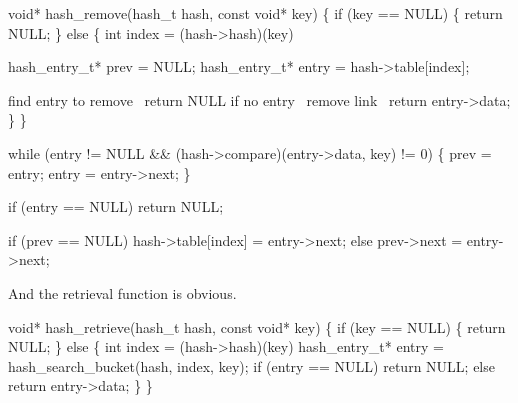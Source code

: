 \nwenddocs{}\plusendmoddef
void* hash_remove(hash_t hash, const void* key)
\{
    if (key == NULL) \{
        return NULL;
    \} else \{
        int index = (hash->hash)(key) %

        hash_entry_t* prev  = NULL;
        hash_entry_t* entry = hash->table[index];

        \LA{}find entry to remove~{\nwtagstyle{}}\RA{}
        \LA{}return NULL if no entry~{\nwtagstyle{}}\RA{}
        \LA{}remove link~{\nwtagstyle{}}\RA{}
        return entry->data;
    \}
\}

\nwendcode{}\nwdocspar

\nwenddocs{}\endmoddef
while (entry != NULL && (hash->compare)(entry->data, key) != 0) \{
    prev  = entry;
    entry = entry->next;
\}

\nwendcode{}\nwdocspar

\nwenddocs{}\endmoddef
if (entry == NULL)
    return NULL;

\nwendcode{}\nwdocspar

\nwenddocs{}\endmoddef
if (prev == NULL)
    hash->table[index] = entry->next;
else
    prev->next = entry->next;

\nwendcode{}\nwdocspar

And the retrieval function is obvious.

\nwenddocs{}\plusendmoddef
void* hash_retrieve(hash_t hash, const void* key)
\{
    if (key == NULL) \{
        return NULL;
    \} else \{
        int index = (hash->hash)(key) %
        hash_entry_t* entry = hash_search_bucket(hash, index, key);
        if (entry == NULL)
            return NULL;
        else
            return entry->data;
    \}
\}

